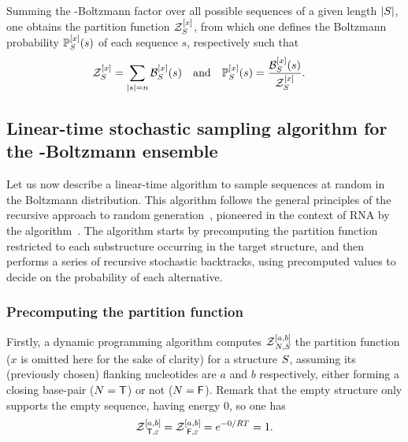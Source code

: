 Summing the \GCWeighted-Boltzmann factor over all possible sequences of a given length $|\Struct|$, one obtains the \GCWeighted partition function $\mathcal{Z}_{\Struct}^{[x]}$, from which one defines the \GCWeighted Boltzmann probability $\Prob_{\Struct}^{[x]}(s)$ of each sequence $s$, respectively such that 
\begin{align}\mathcal{Z}_{\Struct}^{[x]} &= \sum_{\substack{|s|=n}}\B_{\Struct}^{[x]}(s)& \text{and}&&
\Prob_{\Struct}^{[x]}(s) &= \frac{\B_{\Struct}^{[x]}(s)}{\mathcal{Z}_{\Struct}^{[x]}}.\label{def:distribution}\end{align}

\subsection{Linear-time stochastic sampling algorithm for the \GCWeighted-Boltzmann ensemble}

Let us now describe a linear-time algorithm to sample sequences at random in the \GCWeighted Boltzmann distribution. This algorithm follows the general principles of the recursive approach to random generation~\citep{Wilf1977}, pioneered in the context of RNA by the \SFold algorithm~\citep{Ding2003}. The algorithm starts by precomputing the partition function restricted to each substructure occurring in the target structure, and then performs a series of recursive stochastic backtracks, using precomputed values to decide on the probability of each alternative. 

\subsubsection{Precomputing the \GCWeighted partition function}\label{sec:pf}

Firstly, a dynamic programming algorithm computes $\Z{\N,\Struct}{a,b}$ the \GCWeighted partition function ($x$ is omitted here for the sake of clarity) for a structure $\Struct$, assuming its (previously chosen) flanking nucleotides are $a$ and $b$ respectively, either forming a closing base-pair ($\N=\BoolTrue$) or not ($\N=\BoolFalse$). 
Remark that the empty structure only supports the empty sequence, having energy $0$, so one has
\begin{equation}
	\Z{\BoolTrue,\varepsilon}{a,b}=\Z{\BoolFalse,\varepsilon}{a,b}= e^{-0/RT} = 1.
	\label{eq:Z_in}
\end{equation}


